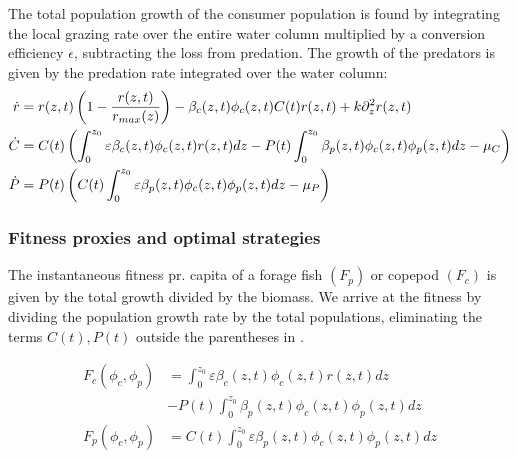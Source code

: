 The total population growth of the consumer population is found by integrating the local grazing rate over the entire water column multiplied by a conversion efficiency $\epsilon$, subtracting the loss from predation. The growth of the predators is given by the predation rate integrated over the water column:
\begin{align}
	\dot{r} &= r(z,t)\pa{1-\frac{r(z,t)}{r_{max}(z)}} - \beta_c(z,t)\phi_c(z,t)C(t) r(z,t)  + k \partial_z^2 r(z,t)\\
	\dot{C} &= C(t)\left ( \int_0^{z_0} \varepsilon \beta_c(z,t)\phi_c(z,t)r(z,t) dz- P(t)\int_0^{z_0} \beta_p(z,t) \phi_c(z,t) \phi_p(z,t) dz - \mu_C \right ) \\
	\dot{P} &= P(t) \left ( C(t )\int_0^{z_0} \varepsilon \beta_p(z,t) \phi_c(z,t)\phi_p(z,t) dz - \mu_P \right )
  \label{eq:population_growth_prob_dens}
\end{align}


\subsubsection*{Fitness proxies and optimal strategies}

The instantaneous fitness pr. capita of a forage fish $(F_p)$ or copepod $(F_c)$ is given by the total growth divided by the biomass. We arrive at the fitness by dividing the population growth rate  by the total populations, eliminating the terms $C(t), P(t)$ outside the parentheses in .

\begin{align}
	F_c(\phi_c, \phi_p) &= \int_0^{z_0} \varepsilon \beta_c(z,t)\phi_c(z,t)r(z,t) dz\\ &- P(t)\int_0^{z_0} \beta_p(z,t) \phi_c(z,t) \phi_p(z,t)dz \\
	F_p(\phi_c, \phi_p) &=  C(t) \int_0^{z_0} \varepsilon \beta_p(z,t)\phi_c(z,t)\phi_p(z,t) dz
  \label{eq:fitness}
\end{align}

